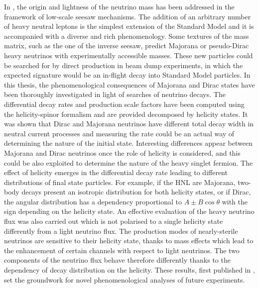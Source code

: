 In , the origin and lightness of the neutrino mass has been addressed %
in the framework of low-scale seesaw mechanisms.
The addition of an arbitrary number of heavy neutral leptons is the simplest extension of the Standard Model %
and it is accompanied with a diverse and rich phenomenology.
Some textures of the mass matrix, such as the one of the inverse seesaw, %
predict Majorana or pseudo-Dirac heavy neutrinos with experimentally accessible masses.
These new particles could be searched for by direct production in beam dump experiments, %
in which the expected signature would be an in-flight decay into Standard Model particles.
In this thesis, the phenomenological consequences of Majorana and Dirac states have been thoroughly investigated %
in light of searches of neutrino decays.
The differential decay rates and production scale factors have been computed using %
the helicity-spinor formalism and are provided decomposed by helicity states.
It was shown that Dirac and Majorana neutrinos have different total decay width in neutral current processes %
and measuring the rate could be an actual way of determining the nature of the initial state.
Interesting differences appear between Majorana and Dirac neutrinos once the role of helicity is considered, %
and this could be also exploited to determine the nature of the heavy singlet fermion.
The effect of helicity emerges in the differential decay rate leading to different %
distributions of final state particles. %
For example, if the HNL are Majorana, two-body decays present an isotropic distribution for both helicity states, %
or if Dirac, the angular distribution has a dependency proportional to $A\pm B \cos\theta$ %
with the sign depending on the helicity state.
An effective evaluation of the heavy neutrino flux was also carried out %
which is not polarised to a single helicity state differently from a light neutrino flux.
The production modes of nearly-sterile neutrinos are sensitive to their helicity state, %
thanks to mass effects which lead to the enhancement of certain channels with respect to light neutrinos.
The two components of the neutrino flux behave therefore differently thanks to the dependency of decay distribution on the helicity.
These results, first published in , set the groundwork for novel phenomenological analyses %
of future experiments.

